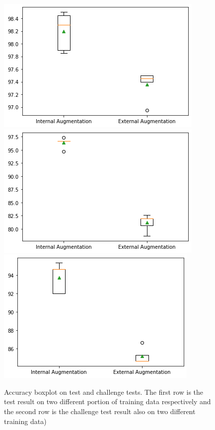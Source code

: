 \documentclass{article}
\begin{document}
\begin{figure}[!htb]
\endminipage\hfill
{}
  \includegraphics[width=\linewidth]{figure/aug_test_2.png}
\endminipage\hfill
{}
  \includegraphics[width=\linewidth]{figure/aug_challenge_1.png}
\endminipage\hfill
{}
  \includegraphics[width=\linewidth]{figure/aug_challenge_2.png}
\endminipage\hfill
\caption{Accuracy boxplot on test and challenge tests. The first row is the test result on two different portion of training data respectively and the second row is the challenge test result also on two different training data)}
\label{aug_box}
\end{figure}
\end{document}
